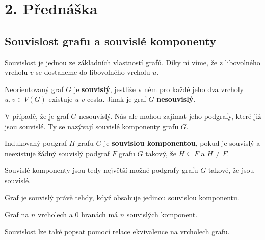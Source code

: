 \section{2. Přednáška}

\subsection{Souvislost grafu a souvislé komponenty}

Souvislost je jednou ze základních vlastností grafů. Díky ní víme, že z libovolného vrcholu $v$ se dostaneme do libovolného vrcholu $u$. \bigskip

\begin{definition}
Neorientovaný graf $G$ je \textbf{souvislý}, jestliže v něm pro každé jeho dva vrcholy $u, v \in V(G)$ existuje $u$-$v$-cesta. Jinak je graf $G$ \textbf{nesouvislý}.
\end{definition} \bigskip

\noindent V případě, že je graf $G$ nesouvislý. Nás ale mohou zajímat jeho podgrafy, které již jsou souvislé. Ty se nazývají souvislé komponenty grafu $G$. \bigskip

\begin{definition}
Indukovaný podgraf $H$ grafu $G$ je \textbf{souvislou komponentou}, pokud je souvislý a neexistuje žádný souvislý podgraf $F$ grafu $G$ takový, že $H \subseteq F$ a $H \neq F$.
\end{definition}

\noindent Souvislé komponenty jsou tedy největší možné podgrafy grafu $G$ takové, že jsou souvislé.

\begin{center}
    
\end{center}

\begin{observation}
Graf je souvislý právě tehdy, když obsahuje jedinou souvislou komponentu.
\end{observation} 

\begin{observation}
Graf na $n$ vrcholech a 0 hranách má $n$ souvislých komponent.
\end{observation}

\bigskip

\noindent Souvislost lze také popsat pomocí relace ekvivalence na vrcholech grafu.

